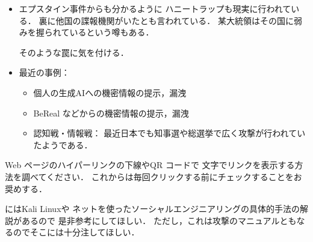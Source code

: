 \begin{itemize}
\begin{itemize}
         \item 
            個人情報を調べるための景品付きアンケートなどの
            合法な情報収集(\cite{Ba})
                        
         \item
            格安のスマートテレビ(Android TV)に搭載されたACR (=Automated Content Recognition 自動コンテンツ認識)による情報漏洩
         \item
            イランへの攻撃では，モサド・アマン(8200部隊)が
            監視カメラをハッキングしたり，
            攻撃先に秘密カメラを仕込んだりしていたことが明らかになった．
            
         \item
            一部の国は国家情報法を持ち，
            海外の自国民を監視するため外国に秘密警察を持っている．
            他国民を監視していない保証もない．
           
      \end{itemize}
 
      
      
   \item 
      エプスタイン事件からも分かるように
      ハニートラップも現実に行われている．
      裏に他国の諜報機関がいたとも言われている．
      某大統領はその国に弱みを握られているという噂もある．
      
      そのような罠に気を付ける．

   \item 
      最近の事例：
      \begin{itemize}
         \item 
            個人の生成AIへの機密情報の提示，漏洩
         \item
            BeReal などからの機密情報の提示，漏洩
         \item
            認知戦・情報戦：
            最近日本でも知事選や総選挙で広く攻撃が行われていたようである．
      \end{itemize}
\end{itemize}

\begin{Q}
   Web ページのハイパーリンクの下線やQR コードで
   文字でリンクを表示する方法を調べてください．
   これからは毎回クリックする前にチェックすることをお奨めする．
\end{Q}

\cite{GM}にはKali Linuxや
ネットを使ったソーシャルエンジニアリングの具体的手法の解説があるので
是非参考にしてほしい．
ただし，これは攻撃のマニュアルともなるのでそこには十分注してほしい．

